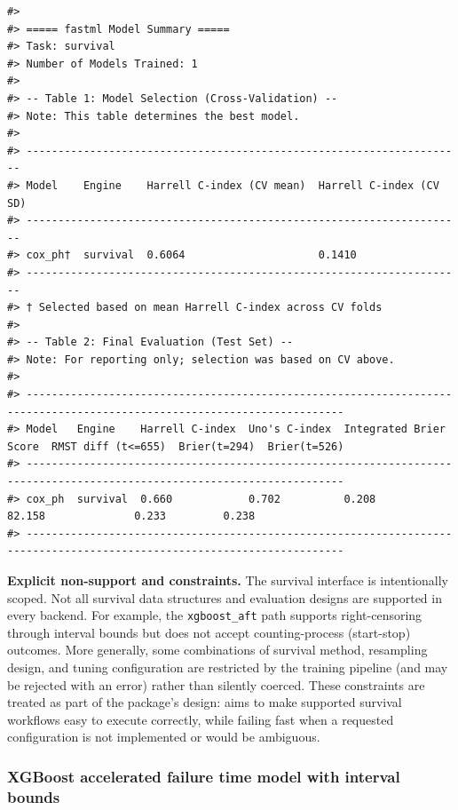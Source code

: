\begin{verbatim}
#> 
#> ===== fastml Model Summary =====
#> Task: survival 
#> Number of Models Trained: 1 
#> 
#> -- Table 1: Model Selection (Cross-Validation) --
#> Note: This table determines the best model.
#> 
#> --------------------------------------------------------------------- 
#> Model    Engine    Harrell C-index (CV mean)  Harrell C-index (CV SD) 
#> --------------------------------------------------------------------- 
#> cox_ph†  survival  0.6064                     0.1410                  
#> --------------------------------------------------------------------- 
#> † Selected based on mean Harrell C-index across CV folds
#> 
#> -- Table 2: Final Evaluation (Test Set) --
#> Note: For reporting only; selection was based on CV above.
#> 
#> ------------------------------------------------------------------------------------------------------------------------ 
#> Model   Engine    Harrell C-index  Uno's C-index  Integrated Brier Score  RMST diff (t<=655)  Brier(t=294)  Brier(t=526) 
#> ------------------------------------------------------------------------------------------------------------------------ 
#> cox_ph  survival  0.660            0.702          0.208                   82.158              0.233         0.238        
#> ------------------------------------------------------------------------------------------------------------------------
\end{verbatim}

\textbf{Explicit non-support and constraints.}
The survival interface is intentionally scoped. Not all survival data structures and evaluation designs are supported in every backend. For example, the \texttt{xgboost\_aft} path supports right-censoring through interval bounds but does not accept counting-process (start-stop) outcomes. More generally, some combinations of survival method, resampling design, and tuning configuration are restricted by the training pipeline (and may be rejected with an error) rather than silently coerced. These constraints are treated as part of the package's design:  aims to make supported survival workflows easy to execute correctly, while failing fast when a requested configuration is not implemented or would be ambiguous.

\subsubsection{XGBoost accelerated failure time model with interval bounds}\label{xgboost-accelerated-failure-time-model-with-interval-bounds}

